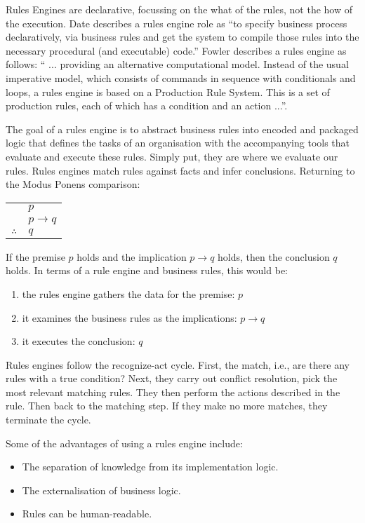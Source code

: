 Rules Engines are declarative, focussing on the what of the rules, not the how of the execution.
Date\cite{date2000not} describes a rules engine role as ``to specify business process declaratively, via business rules and get the system to compile those rules into the necessary procedural (and executable) code.''
Fowler\cite{Fowler_rulesEngine} describes a rules engine as follows: `` ... providing an alternative computational model.
Instead of the usual imperative model, which consists of commands in sequence with conditionals and loops, a rules engine is based on a Production Rule System.
This is a set of production rules, each of which has a condition and an action ...''.

The goal of a rules engine is to abstract business rules into encoded and packaged logic that defines the tasks of an organisation with the accompanying tools that evaluate and execute these rules.
Simply put, they are where we evaluate our rules.
Rules engines match rules against facts and infer conclusions.
Returning to the Modus Ponens comparison:

\begin{tabular}{c@{\,}l@{}} 
    & $p$ \\
\arrayrulecolor{blue!60!green!70}    & $p \to q$ \\\cline{2-2}
$\therefore$         & $q$ \\
\end{tabular}

If the premise $p$ holds and the implication $p \to q$ holds, then the conclusion $q$ holds.
In terms of a rule engine and business rules, this would be:
\begin{enumerate}
    \setlength\itemsep{0em}
    \item the rules engine gathers the data for the premise: $p$
    \item it examines the business rules as the implications: $p \to q$
    \item it executes the conclusion: $q$
\end{enumerate}

Rules engines follow the recognize-act cycle.
First, the match, i.e., are there any rules with a true condition?
Next, they carry out conflict resolution, pick the most relevant matching rules.
They then perform the actions described in the rule.
Then back to the matching step.
If they make no more matches, they terminate the cycle.

Some of the advantages of using a rules engine include:
\begin{itemize}
    \setlength\itemsep{0em}
    \item The separation of knowledge from its implementation logic.
    \item The externalisation of business logic.
    \item Rules can be human-readable.
\end{itemize}

